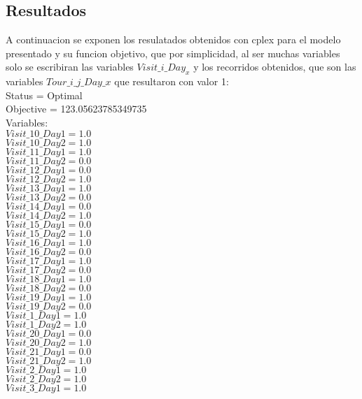 \subsection{Resultados}
A continuacion se exponen los resulatados obtenidos con cplex para el modelo presentado y su funcion objetivo, que por simplicidad, al ser muchas variables solo se escribiran las variables $Visit\_i\_Day_x$ y los recorridos obtenidos, que son las variables $Tour\_i\_j\_Day\_x$ que resultaron con valor 1: \\
Status = Optimal\\
Objective = 123.05623785349735\\
Variables: \\
$Visit\_10\_Day1 = 1.0$\\
$Visit\_10\_Day2 = 1.0$\\
$Visit\_11\_Day1 = 1.0$\\
$Visit\_11\_Day2 = 0.0$\\
$Visit\_12\_Day1 = 0.0$\\
$Visit\_12\_Day2 = 1.0$\\
$Visit\_13\_Day1 = 1.0$\\
$Visit\_13\_Day2 = 0.0$\\
$Visit\_14\_Day1 = 0.0$\\
$Visit\_14\_Day2 = 1.0$\\
$Visit\_15\_Day1 = 0.0$\\
$Visit\_15\_Day2 = 1.0$\\
$Visit\_16\_Day1 = 1.0$\\
$Visit\_16\_Day2 = 0.0$\\
$Visit\_17\_Day1 = 1.0$\\
$Visit\_17\_Day2 = 0.0$\\
$Visit\_18\_Day1 = 1.0$\\
$Visit\_18\_Day2 = 0.0$\\
$Visit\_19\_Day1 = 1.0$\\
$Visit\_19\_Day2 = 0.0$\\
$Visit\_1\_Day1 = 1.0$\\
$Visit\_1\_Day2 = 1.0$\\
$Visit\_20\_Day1 = 0.0$\\
$Visit\_20\_Day2 = 1.0$\\
$Visit\_21\_Day1 = 0.0$\\
$Visit\_21\_Day2 = 1.0$\\
$Visit\_2\_Day1 = 1.0$\\
$Visit\_2\_Day2 = 1.0$\\
$Visit\_3\_Day1 = 1.0$\\
